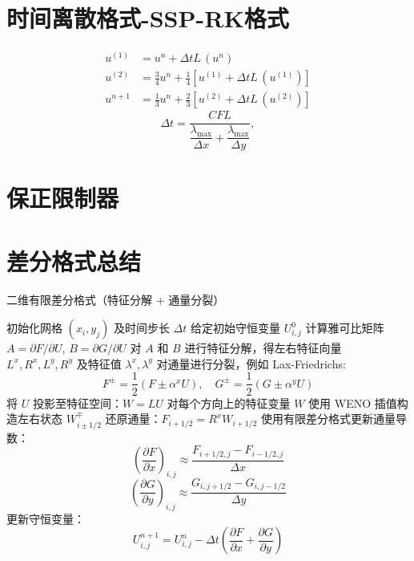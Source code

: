 \documentclass{article}
\numberwithin{equation}{section}    %
\begin{document}
\section{时间离散格式-SSP-RK格式}
\begin{subequations}
    \begin{align}
        u^{(1)} &= u^n + \Delta t L \, (u^n)\\
        u^{(2)} &= \frac{3}{4}u^n + \frac{1}{4} \left[ u^{(1)} + \Delta t L \, (u^{(1)}) \right]\\
        u^{n+1} &= \frac{1}{3}u^n + \frac{2}{3} \left[ u^{(2)} + \Delta t L \, (u^{(2)}) \right]
    \end{align}
\end{subequations}
\begin{equation}
    \Delta t = \dfrac{CFL}{\dfrac{\lambda_{\max}}{\Delta x}+\dfrac{\lambda_{\max}}{\Delta y}  },
\end{equation}


\section{保正限制器}

\section{差分格式总结}
\begin{algorithm}[H]
    \caption{二维有限差分格式（特征分解 + 通量分裂）}
    \begin{algorithmic}[1]
    \State 初始化网格 $(x_i, y_j)$ 及时间步长 $\Delta t$
    \State 给定初始守恒变量 $U_{i,j}^0$
            \State 计算雅可比矩阵 $A = \partial F / \partial U$, $B = \partial G / \partial U$
            \State 对 $A$ 和 $B$ 进行特征分解，得左右特征向量 $L^x, R^x, L^y, R^y$ 及特征值 $\lambda^x, \lambda^y$
            \State 对通量进行分裂，例如 Lax-Friedrichs:
            \[
            F^{\pm} = \frac{1}{2}(F \pm \alpha^x U),\quad
            G^{\pm} = \frac{1}{2}(G \pm \alpha^y U)
            \]
            \State 将 $U$ 投影至特征空间：$W = L U$
            \State 对每个方向上的特征变量 $W$ 使用 WENO 插值构造左右状态 $W_{i\pm 1/2}^\mp$
            \State 还原通量：$F_{i+1/2} = R^x W_{i+1/2}$
            \State 使用有限差分格式更新通量导数：
            \[
            \left( \frac{\partial F}{\partial x} \right)_{i,j} \approx \frac{F_{i+1/2,j} - F_{i-1/2,j}}{\Delta x}
            \]
            \[
            \left( \frac{\partial G}{\partial y} \right)_{i,j} \approx \frac{G_{i,j+1/2} - G_{i,j-1/2}}{\Delta y}
            \]
            \State 更新守恒变量：
            \[
            U_{i,j}^{n+1} = U_{i,j}^n - \Delta t \left( \frac{\partial F}{\partial x} + \frac{\partial G}{\partial y} \right)
            \]
        \EndFor
    \EndFor
    \end{algorithmic}
    \end{algorithm}
\end{document}
